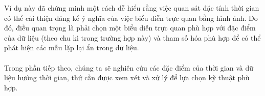 Ví dụ này đã chứng minh một cách dễ hiểu rằng việc quan sát đặc tính thời gian có thể cải thiện đáng kể ý nghĩa của việc biểu diễn trực quan bằng hình ảnh. Do đó, điều quan trọng là phải chọn một biểu diễn trực quan phù hợp với đặc điểm của dữ liệu (theo chu kì trong trường hợp này) và tham số hóa phù hợp để có thể phát hiện các mẫu lặp lại ẩn trong dữ liệu. 
\\ \\
Trong phần tiếp theo, chúng ta sẽ nghiên cứu các đặc điểm của thời gian và dữ liệu hướng thời gian, thứ cần được xem xét và xử lý để lựa chọn kỹ thuật phù hợp.